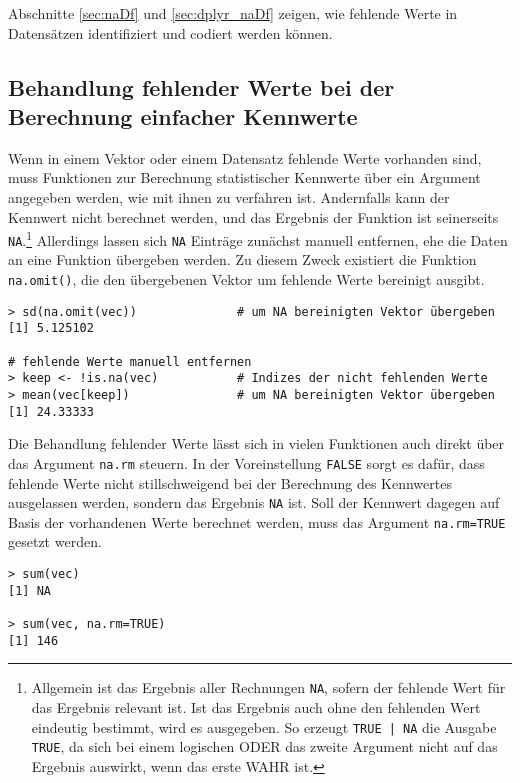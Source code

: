 Abschnitte \ref{sec:naDf} und \ref{sec:dplyr_naDf} zeigen, wie fehlende Werte in Datensätzen identifiziert und codiert werden können.

\subsection{Behandlung fehlender Werte bei der Berechnung einfacher Kennwerte}
\label{sec:treatNA}

Wenn in einem Vektor oder einem Datensatz fehlende Werte vorhanden sind, muss Funktionen zur Berechnung statistischer Kennwerte über ein Argument angegeben werden, wie mit ihnen zu verfahren ist. Andernfalls kann der Kennwert nicht berechnet werden, und das Ergebnis der Funktion ist seinerseits \lstinline!NA!\@.\footnote{\label{ftn:whenNA}Allgemein ist das Ergebnis aller Rechnungen \lstinline!NA!, sofern der fehlende Wert für das Ergebnis relevant ist. Ist das Ergebnis auch ohne den fehlenden Wert eindeutig bestimmt, wird es ausgegeben. So erzeugt \lstinline!TRUE | NA! die Ausgabe \lstinline!TRUE!, da sich bei einem logischen ODER das zweite Argument nicht auf das Ergebnis auswirkt, wenn das erste WAHR ist.} Allerdings lassen sich \lstinline!NA! Einträge zunächst manuell entfernen, ehe die Daten an eine Funktion übergeben werden. Zu diesem Zweck existiert die Funktion \lstinline!na.omit()!, die den übergebenen Vektor um fehlende Werte bereinigt ausgibt.
\begin{lstlisting}
> sd(na.omit(vec))              # um NA bereinigten Vektor übergeben
[1] 5.125102

# fehlende Werte manuell entfernen
> keep <- !is.na(vec)           # Indizes der nicht fehlenden Werte
> mean(vec[keep])               # um NA bereinigten Vektor übergeben
[1] 24.33333
\end{lstlisting}

Die Behandlung fehlender Werte lässt sich in vielen Funktionen auch direkt über das Argument \lstinline!na.rm! steuern. In der Voreinstellung \lstinline!FALSE! sorgt es dafür, dass fehlende Werte nicht stillschweigend bei der Berechnung des Kennwertes ausgelassen werden, sondern das Ergebnis \lstinline!NA! ist. Soll der Kennwert dagegen auf Basis der vorhandenen Werte berechnet werden, muss das Argument \lstinline!na.rm=TRUE! gesetzt werden.
\begin{lstlisting}
> sum(vec)
[1] NA

> sum(vec, na.rm=TRUE)
[1] 146
\end{lstlisting}

